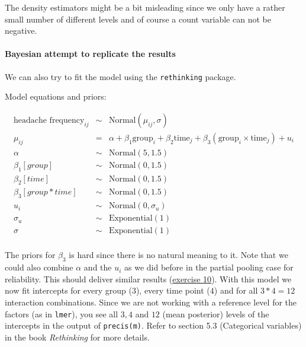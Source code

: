 \documentclass[
]{article}
\begin{document}
The density estimators might be a bit misleading since we only have a
rather small number of different levels and of course a count variable
can not be negative.

\paragraph{Bayesian attempt to replicate the
results}\label{mulligan_bayesian}

We can also try to fit the model using the \texttt{rethinking} package.

Model equations and priors:

\[
\begin{array}{rcl}
\text{headache frequency}_{ij} &\sim& \text{Normal}(\mu_{ij}, \sigma) \\
\mu_{ij} &=& \alpha + \beta_1 \text{group}_i + \beta_2 \text{time}_j + 
              \beta_3 (\text{group}_i \times \text{time}_j) + u_i\\
\alpha &\sim& \text{Normal}(5, 1.5) \\
\beta_1[group] &\sim& \text{Normal}(0, 1.5) \\
\beta_2[time] &\sim& \text{Normal}(0, 1.5) \\
\beta_3[group*time] &\sim& \text{Normal}(0, 1.5) \\ 
u_i &\sim& \text{Normal}(0, \sigma_u) \\
\sigma_u &\sim& \text{Exponential}(1) \\
\sigma &\sim& \text{Exponential}(1) \\
\end{array}
\]

The priors for \(\beta_3\) is hard since there is no natural meaning to
it. Note that we could also combine \(\alpha\) and the \(u_i\) as we did
before in the partial pooling case for reliability. This should deliver
similar results (\hyperref[exercise10_LMM]{exercise 10}). With this
model we now fit intercepts for every group (\(3\)), every time point
(\(4\)) and for all \(3*4=12\) interaction combinations. Since we are
not working with a reference level for the factors (as in
\texttt{lmer}), you see all \(3,4\) and \(12\) (mean posterior) levels
of the intercepts in the output of \texttt{precis(m)}. Refer to section
5.3 (Categorical variables) in the book \emph{Rethinking} for more
details.
\end{document}
